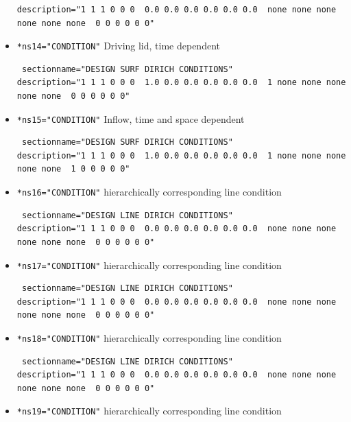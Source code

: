 \begin{itemize}
\begin{small}
\begin{verbatim}
description="1 1 1 0 0 0  0.0 0.0 0.0 0.0 0.0 0.0  none none none none none none  0 0 0 0 0 0"
\end{verbatim} \end{small} \item \verb|*ns14="CONDITION"| \qquad Driving lid, time dependent
\begin{small} \begin{verbatim} sectionname="DESIGN SURF DIRICH CONDITIONS"
description="1 1 1 0 0 0  1.0 0.0 0.0 0.0 0.0 0.0  1 none none none none none  0 0 0 0 0 0"
\end{verbatim} \end{small} \item \verb|*ns15="CONDITION"| \qquad Inflow, time and space dependent
\begin{small} \begin{verbatim} sectionname="DESIGN SURF DIRICH CONDITIONS"
description="1 1 1 0 0 0  1.0 0.0 0.0 0.0 0.0 0.0  1 none none none none none  1 0 0 0 0 0"
\end{verbatim} \end{small} \item \verb|*ns16="CONDITION"| \qquad hierarchically corresponding line condition
\begin{small} \begin{verbatim} sectionname="DESIGN LINE DIRICH CONDITIONS"
description="1 1 1 0 0 0  0.0 0.0 0.0 0.0 0.0 0.0  none none none none none none  0 0 0 0 0 0"
\end{verbatim} \end{small} \item \verb|*ns17="CONDITION"| \qquad hierarchically corresponding line condition
\begin{small} \begin{verbatim} sectionname="DESIGN LINE DIRICH CONDITIONS"
description="1 1 1 0 0 0  0.0 0.0 0.0 0.0 0.0 0.0  none none none none none none  0 0 0 0 0 0"
\end{verbatim} \end{small} \item \verb|*ns18="CONDITION"| \qquad hierarchically corresponding line condition
\begin{small} \begin{verbatim} sectionname="DESIGN LINE DIRICH CONDITIONS"
description="1 1 1 0 0 0  0.0 0.0 0.0 0.0 0.0 0.0  none none none none none none  0 0 0 0 0 0"
\end{verbatim} \end{small} \item \verb|*ns19="CONDITION"| \qquad hierarchically corresponding line condition

\end{itemize}
